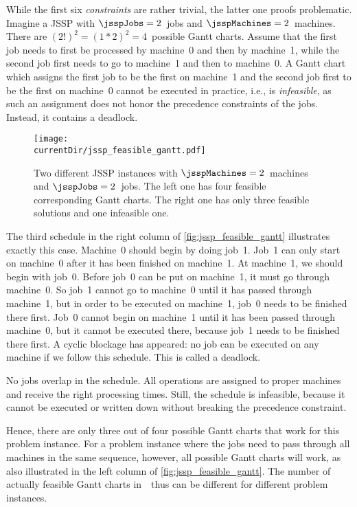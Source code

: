 %
While the first six \emph{constraints} are rather trivial, the latter one proofs problematic.
Imagine a \gls{JSSP} with $\jsspJobs=2$~jobs and $\jsspMachines=2$~machines.
There are $(2!)^2=(1*2)^2=4$~possible Gantt charts.
Assume that the first job needs to first be processed by machine~0 and then by machine~1, while the second job first needs to go to machine~1 and then to machine~0.
A Gantt chart which assigns the first job to be the first on machine~1 and the second job first to be the first on machine~$0$ cannot be executed in practice, i.e., is \emph{infeasible}, as such an assignment does not honor the precedence constraints of the jobs.
Instead, it contains a deadlock.

\begin{figure}%
\centering%
\texttt{[image: \\currentDir/jssp\_feasible\_gantt.pdf]}%
\caption{Two different JSSP instances with $\jsspMachines=2$~machines and $\jsspJobs=2$~jobs.%
The left one has four feasible corresponding Gantt charts.
The right one has only three feasible solutions and one infeasible one.}%
\label{fig:jssp_feasible_gantt}%
\end{figure}%

The third schedule in the right column of \autoref{fig:jssp_feasible_gantt} illustrates exactly this case.
Machine~0 should begin by doing job~1.
Job~1 can only start on machine~0 after it has been finished on machine~1.
At machine~1, we should begin with job~0.
Before job~0 can be put on machine~1, it must go through machine~0.
So job~1 cannot go to machine~0 until it has passed through machine~1, but in order to be executed on machine~1, job~0 needs to be finished there first.
Job~0 cannot begin on machine~1 until it has been passed through machine~0, but it cannot be executed there, because job~1 needs to be finished there first.
A cyclic blockage has appeared: no job can be executed on any machine if we follow this schedule.
This is called a deadlock.

No jobs overlap in the schedule.
All operations are assigned to proper machines and receive the right processing times.
Still, the schedule is infeasible, because it cannot be executed or written down without breaking the precedence constraint.

Hence, there are only three out of four possible Gantt charts that work for this problem instance.
For a problem instance where the jobs need to pass through all machines in the same sequence, however, all possible Gantt charts will work, as also illustrated in the left column of \autoref{fig:jssp_feasible_gantt}.
The number of actually feasible Gantt charts in~\solutionSpace\ thus can be different for different problem instances.

